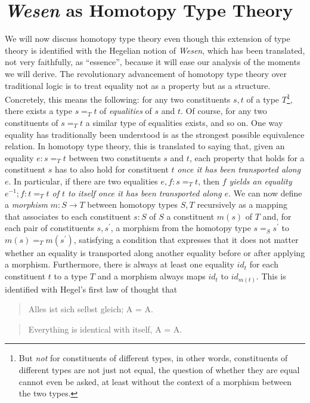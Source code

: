 \documentclass{article}
\begin{document}
\section{\emph{Wesen} as Homotopy Type Theory}\label{Hott}
We will now discuss homotopy type theory even though this extension of type theory is identified with the Hegelian notion of \emph{Wesen}, which has been translated, not very faithfully, as ``essence'', because it will ease our analysis of the moments we will derive. The revolutionary advancement of homotopy type theory over traditional logic is to treat equality not as a property but as a structure. Concretely, this means the following: for any two constituents $s,t$ of a type $T$\footnote{But \emph{not} for constituents of different types, in other words, constituents of different types are not just not equal, the question of whether they are equal cannot even be asked, at least without the context of a morphism between the two types.}, there exists a type $s=_T t$ of \emph{equalities} of $s$ and $t$. Of course, for any two constituents of $s=_T t$ a similar type of equalities exists, and so on. One way equality has traditionally been understood is as the strongest possible equivalence relation. In homotopy type theory, this is translated to saying that, given an equality $e:s=_T t$ between two constituents $s$ and $t$, each property that holds for a constituent $s$ has to also hold for constituent $t$ \emph{once it has been transported along $e$}. In particular, if there are two equalities $e,f:s=_T t$, then \emph{$f$ yields an equality $e^{-1};f:t=_T t$ of $t$ to itself once it has been transported along $e$}. We can now define a \emph{morphism} $m:S\rightarrow T$ between homotopy types $S,T$ recursively as a mapping that associates to each constituent $s:S$ of $S$ a constituent $m(s)$ of $T$ and, for each pair of constituents $s,s^{\prime}$, a morphism from the homotopy type $s=_{S} s^{\prime}$ to $m(s)=_T m(s^{\prime})$, satisfying a condition that expresses that it does not matter whether an equality is transported along another equality before or after applying a morphism. Furthermore, there is always at least one equality $id_t$ for each constituent $t$ to a type $T$ and a morphism always maps $id_t$ to $id_{m(t)}$. This is identified with Hegel's first law of thought that 

\begin{quote}
    Alles ist sich selbst gleich; A = A.
\end{quote}

\begin{quote}
    Everything is identical with itself, A = A.
\end{quote}
\end{document}
